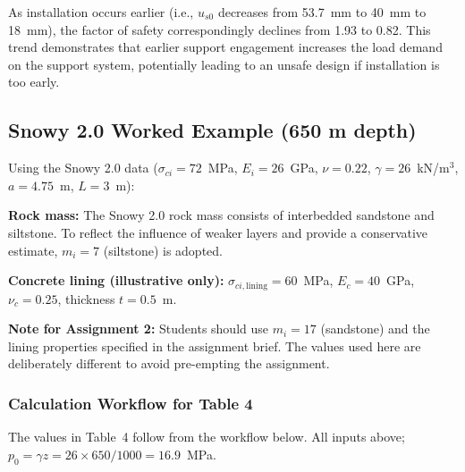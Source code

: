 \documentclass[a4paper,12pt]{article}
\begin{document}
As installation occurs earlier (i.e., $u_{s0}$ decreases from 53.7~mm to 40~mm to 18~mm), the factor of safety correspondingly declines from 1.93 to 0.82. This trend demonstrates that earlier support engagement increases the load demand on the support system, potentially leading to an unsafe design if installation is too early.

\subsection{Snowy 2.0 Worked Example (650 m depth)}

Using the Snowy 2.0 data ($\sigma_{ci}=72$~MPa, $E_i=26$~GPa, $\nu = 0.22$, $\gamma=26$~kN/m$^3$, $a=4.75$~m, $L=3$~m):

\begin{notebox}
\textbf{Rock mass:} The Snowy 2.0 rock mass consists of interbedded sandstone and siltstone. To reflect the influence of weaker layers and provide a conservative estimate, $m_i = 7$ (siltstone) is adopted.
\vspace{0.5em}

\textbf{Concrete lining (illustrative only):} $\sigma_{ci,\text{lining}} = 60$~MPa, $E_c = 40$~GPa, $\nu_c = 0.25$, thickness $t = 0.5$~m.
\vspace{0.5em}

\textbf{Note for Assignment 2:} Students should use $m_i = 17$ (sandstone) and the lining properties specified in the assignment brief. The values used here are deliberately different to avoid pre-empting the assignment.
\end{notebox}

\subsubsection{Calculation Workflow for Table 4}

The values in Table~4 follow from the workflow below. All inputs above; $p_0 = \gamma z = 26 \times 650/1000 = 16.9$~MPa.
\end{document}
